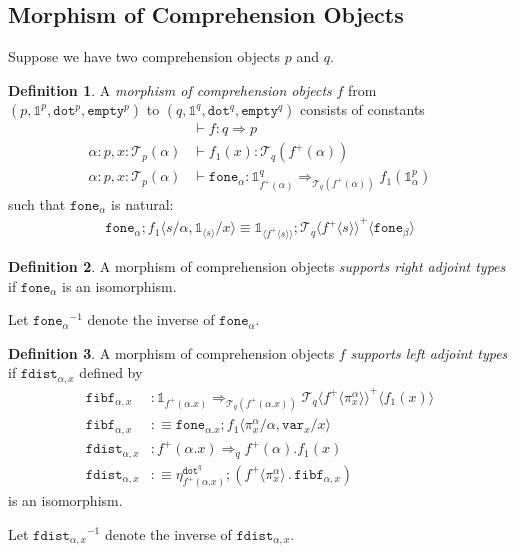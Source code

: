 \documentclass[10pt]{article}
\theoremstyle{definition}
\newtheorem{definition}{Definition}
\newcommand{\yields}{\vdash}
\newcommand{\tcell}{\Rightarrow}
\newcommand\TrPlus[2]{\ensuremath{{#1}^+(#2)}}
\newcommand\El[2]{\mathcal{T}_{#1}(#2)}
\newcommand\ApEl[2]{\mathcal{T}_{#1}\langle#2\rangle}
\newcommand\bdot[0]{\mathbin{.}}
\newcommand\ap[2]{\ensuremath{#1 \langle #2 \rangle }}
\newcommand\ApPlus[2]{\ensuremath{{#1}^+ \langle #2 \rangle }}
\newcommand{\tdot}{\ensuremath{\mathtt{dot}}}
\newcommand{\tempty}{\ensuremath{\mathtt{empty}}}
\newcommand\One{\ensuremath{\mathds{1}}}
\newcommand\var[1]{\ensuremath{\mathtt{var}_{#1}}}
\newcommand\ApOne[1]{\ensuremath{\One_{\langle {#1} \rangle }}}
\newcommand\fone[1]{\ensuremath{\mathtt{fone}_{#1}}}
\newcommand\fibf[1]{\ensuremath{\mathtt{fibf}_{#1}}}
\newcommand\foneinv[1]{\ensuremath{\fone{#1}^{-1}}}
\newcommand\fdist[1]{\ensuremath{\mathtt{fdist}_{#1}}}
\newcommand\fdistinv[1]{\ensuremath{\fdist{#1}^{-1}}}
\begin{document}
\subsection{Morphism of Comprehension Objects}

Suppose we have two comprehension objects $p$ and $q$.

\begin{definition}\label{def:morphism-comprehension-object}
A \emph{morphism of comprehension objects} $f$ from $(p, \One^p, \tdot^p, \tempty^p)$ to $(q, \One^q, \tdot^q, \tempty^q)$ consists of constants
\begin{align*}
&\yields f : q \tcell p \\
\alpha : p, x : \El{p}{\alpha} &\yields f_1(x) : \El{q}{\TrPlus{f}{\alpha}} \\
\alpha : p, x : \El{p}{\alpha} &\yields \fone{\alpha} : \One^q_{\TrPlus{f}{\alpha}}  \tcell_{\El{q}{\TrPlus{f}{\alpha}}} f_1(\One^p_\alpha)
\end{align*}
such that $\fone{\alpha}$ is natural:
\begin{align}
\fone{\alpha};\ap{f_1}{s/\alpha, \ApOne{s}/x} \equiv \ApOne{\ApPlus{f}{s}};\ApPlus{\ApEl{q}{\ApPlus{f}{s}}}{\fone{\beta}}
\end{align}
\end{definition}

\begin{definition}
A morphism of comprehension objects \emph{supports right adjoint types} if $\fone{\alpha}$ is an isomorphism.
\end{definition}
Let $\foneinv{\alpha}$ denote the inverse of $\fone{\alpha}$.

\begin{definition}
A morphism of comprehension objects $f$ \emph{supports left adjoint types} if $\fdist{\alpha, x}$ defined by
\begin{align*}
\fibf{\alpha, x} &: \One_{\TrPlus{f}{\alpha.x}} \tcell_{\El{q}{\TrPlus{f}{\alpha.x}}} \ApPlus{\ApEl{q}{\ApPlus{f}{\pi^\alpha_x}}}{f_1(x)} \\
\fibf{\alpha, x} &:\equiv \fone{\alpha.x};\ap{f_1}{\pi^\alpha_x/\alpha, \var{x}/x} \\
\fdist{\alpha, x} &: \TrPlus{f}{\alpha.x} \tcell_q \TrPlus{f}{\alpha}.f_1(x) \\
\fdist{\alpha, x} &:\equiv \eta^{\tdot^q}_{\TrPlus{f}{\alpha.x}} ; (\ApPlus{f}{\pi^\alpha_x} \bdot \fibf{\alpha, x})
\end{align*}
is an isomorphism.
\end{definition}
Let $\fdistinv{\alpha,x}$ denote the inverse of $\fdist{\alpha,x}$.
\end{document}
